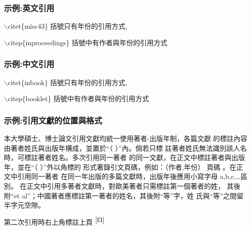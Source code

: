 \subsubsection{示例:英文引用}
$\backslash$citet\{misc43\} 括號只有年份的引用方式,\citet{misc43}\label{misc43}

$\backslash$citep\{inproceedings\} 括號中有作者與年份的引用方式\citep{inproceedings}

\subsubsection{示例:中文引用}
$\backslash$citet\{inbook\} 括號只有年份的引用方式,\citet{inbook}\label{inbook}

$\backslash$citep\{booklet\} 括號中有作者與年份的引用方式\citep{booklet}


\clearpage
\subsubsection{示例:引用文獻的位置與格式}
\par 本大學碩士、博士論文引用文獻均統一使用著者-出版年制，各篇文獻
的標註內容由著者姓氏與出版年構成，並置於“（ ）”內。倘若只標
註著者姓氏無法識別該人名時，可標註著者姓名。多次引用同一著者
的同一文獻，在正文中標註著者與出版年，並在“（ ）”外以角標的
形式著錄引文頁碼，例如：（作者,年份）
頁碼 。在正文中引用同一著者
在同一年出版的多篇文獻時，出版年後應用小寫字母 a,b,c,…區別。
在正文中引用多著者文獻時，對歐美著者只需標註第一個著者的姓，
其後附“et al”；中國著者應標註第一著者的姓名，其後附“等”字，姓
氏與“等”之間留半字元空隙。

第二次引用時右上角標註上頁 \citet{f3}$^{\pageref{f3}}$
